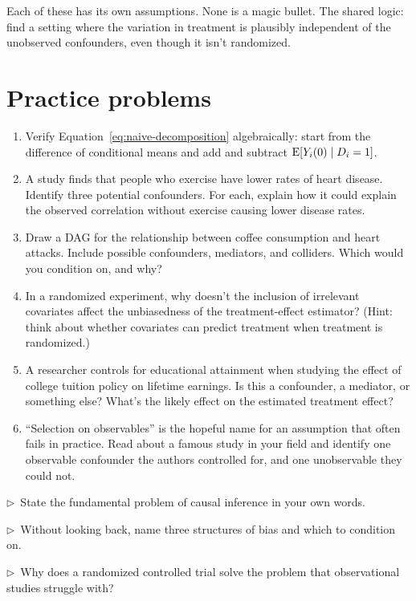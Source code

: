 Each of these has its own assumptions. None is a magic bullet. The shared logic: find a setting where the variation in treatment is plausibly independent of the unobserved confounders, even though it isn't randomized.

\section{Practice problems}

\begin{enumerate}
  \item Verify Equation~\ref{eq:naive-decomposition} algebraically: start from the difference of conditional means and add and subtract $\operatorname{E}[Y_i(0) \mid D_i = 1]$.

  \item A study finds that people who exercise have lower rates of heart disease. Identify three potential confounders. For each, explain how it could explain the observed correlation without exercise causing lower disease rates.

  \item Draw a DAG for the relationship between coffee consumption and heart attacks. Include possible confounders, mediators, and colliders. Which would you condition on, and why?

  \item In a randomized experiment, why doesn't the inclusion of irrelevant covariates affect the unbiasedness of the treatment-effect estimator? (Hint: think about whether covariates can predict treatment when treatment is randomized.)

  \item A researcher controls for educational attainment when studying the effect of college tuition policy on lifetime earnings. Is this a confounder, a mediator, or something else? What's the likely effect on the estimated treatment effect?

  \item ``Selection on observables'' is the hopeful name for an assumption that often fails in practice. Read about a famous study in your field and identify one observable confounder the authors controlled for, and one unobservable they could not.
\end{enumerate}

\begin{reflect}
$\triangleright$~State the fundamental problem of causal inference in your own words.

\smallskip
$\triangleright$~Without looking back, name three structures of bias and which to condition on.

\smallskip
$\triangleright$~Why does a randomized controlled trial solve the problem that observational studies struggle with?
\end{reflect}
